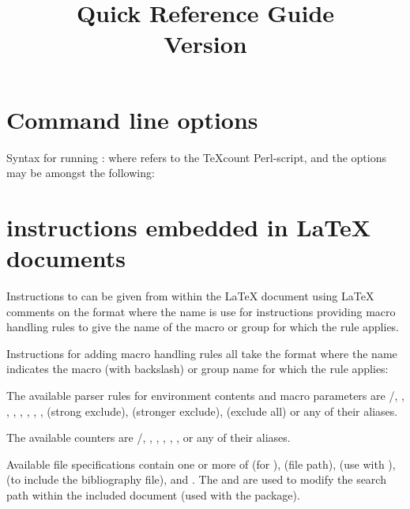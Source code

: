 \documentclass{article}
\title{%
\TeXcount{} Quick Reference Guide\\
Version \version\copyrightfootnote
}
\begin{document}
\maketitle

\section{Command line options}

Syntax for running \TeXcount{}:
where  refers to the TeXcount Perl-script, and the options may be amongst the following:




\section{\TeXcount{} instructions embedded in \LaTeX{} documents}

Instructions to \TeXcount{} can be given from within the
\LaTeX{} document using \LaTeX{} comments on the format
where the name is use for instructions providing macro handling rules to give the name of the macro or group for which the rule applies.
%


Instructions for adding macro handling rules all take the format
where the name indicates the macro (with backslash) or group name for which the rule applies:
%


The available parser rules for environment contents and macro parameters are /, , , , , , , ,  (strong exclude),  (stronger exclude),  (exclude all) or any of their aliases.

The available counters are /, , , , , ,  or any of their aliases.

Available file specifications contain one or more of  (for ),  (file path),  (use with ),  (to include the bibliography file),  and . The  and  are used to modify the search path within the included document (used with the  package).
 
\end{document}

